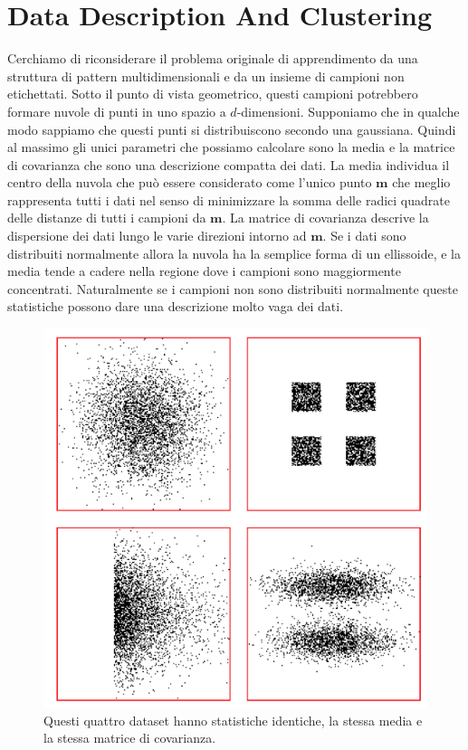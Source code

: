 \section{Data Description And Clustering}
Cerchiamo di riconsiderare il problema originale di apprendimento da una struttura di pattern multidimensionali e da un insieme di campioni non etichettati. Sotto il punto di vista geometrico, questi campioni potrebbero formare nuvole di punti in uno spazio a $d$-dimensioni. Supponiamo che in qualche modo sappiamo che questi punti si distribuiscono secondo una gaussiana. Quindi al massimo gli unici parametri che possiamo calcolare sono la media e la matrice di covarianza che sono una descrizione compatta dei dati. La media individua il centro della nuvola che può essere considerato come l'unico punto $\mathbf{m}$ che meglio rappresenta tutti i dati nel senso di minimizzare la somma delle radici quadrate delle distanze di tutti i campioni da $\mathbf{m}$. La matrice di covarianza descrive la dispersione dei dati lungo le varie direzioni intorno ad $\mathbf{m}$. Se i dati sono distribuiti normalmente allora la nuvola ha la semplice forma di un ellissoide, e la media tende a cadere nella regione dove i campioni sono maggiormente concentrati. Naturalmente se i campioni non sono distribuiti normalmente queste statistiche possono dare una descrizione molto vaga dei dati. 
\begin{figure}
\centering
\includegraphics[scale=0.7]{img/Distribuzioni.png}
\caption{Questi quattro dataset hanno statistiche identiche, la stessa media e la stessa matrice di covarianza. }
\label{distribuzioni}
\end{figure}
